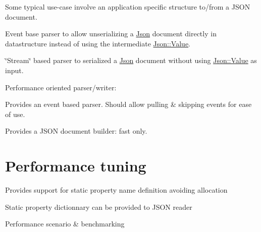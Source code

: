 Some typical use-\/case involve an application specific structure to/from a J\+S\+O\+N document.
\begin{DoxyItemize}
\item Event base parser to allow unserializing a \hyperlink{namespace_json}{Json} document directly in datastructure instead of using the intermediate \hyperlink{class_json_1_1_value}{Json\+::\+Value}.
\item \char`\"{}\+Stream\char`\"{} based parser to serialized a \hyperlink{namespace_json}{Json} document without using \hyperlink{class_json_1_1_value}{Json\+::\+Value} as input.
\item Performance oriented parser/writer\+:
\begin{DoxyItemize}
\item Provides an event based parser. Should allow pulling \& skipping events for ease of use.
\item Provides a J\+S\+O\+N document builder\+: fast only. 
\end{DoxyItemize}
\end{DoxyItemize}\hypertarget{roadmap_ms_perfo}{}\section{Performance tuning}\label{roadmap_ms_perfo}

\begin{DoxyItemize}
\item Provides support for static property name definition avoiding allocation
\item Static property dictionnary can be provided to J\+S\+O\+N reader
\item Performance scenario \& benchmarking 
\end{DoxyItemize}
